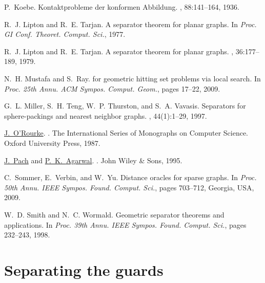 \InSubmitVer{\documentclass[11pt]{article}}
\numberwithin{figure}{section}
\numberwithin{table}{section}
\numberwithin{equation}{section}
\newcommand{\apndlab}[1]{\label{apnd:#1}}
\begin{document}
\begin{thebibliography}{{Har}11b}
P.~Koebe.
\newblock Kontaktprobleme der konformen {Abbildung}.
, 88:141--164, 1936.

R.~J. Lipton and R.~E. Tarjan.
\newblock A separator theorem for planar graphs.
\newblock In {\em Proc. GI Conf. Theoret. Comput. Sci.}, 1977.

R.~J. Lipton and R.~E. Tarjan.
\newblock A separator theorem for planar graphs.
, 36:177--189, 1979.

N.~H. Mustafa and S.~Ray.
 for geometric hitting set problems via local search.
\newblock In {\em Proc. 25th Annu. ACM Sympos. Comput. Geom.\CNFSoCG}, pages
  17--22, 2009.

G.~L. Miller, S.~H. Teng, W.~P. Thurston, and S.~A. Vavasis.
\newblock Separators for sphere-packings and nearest neighbor graphs.
, 44(1):1--29, 1997.

\href{http://cs.smith.edu/~orourke/}{J.~{O'Rourke}}.
.
\newblock The International Series of Monographs on Computer Science. Oxford
  University Press, 1987.

\href{http://www.math.nyu.edu/~pach}{J.~{Pach}} and \href{http://www.cs.duke.edu/~pankaj}{P.~K.~{Agarwal}}.
.
\newblock John Wiley \& Sons, 1995.

C.~Sommer, E.~Verbin, and W.~Yu.
\newblock Distance oracles for sparse graphs.
\newblock In {\em Proc. 50th Annu. IEEE Sympos. Found. Comput. Sci.\CNFFOCS},
  pages 703--712, Georgia, USA, 2009.

W.~D. Smith and N.~C. Wormald.
\newblock Geometric separator theorems and applications.
\newblock In {\em Proc. 39th Annu. IEEE Sympos. Found. Comput. Sci.\CNFFOCS},
  pages 232--243, 1998.

\end{thebibliography}



\appendix

\section{Separating the guards}
\apndlab{sperating:guards}
\end{document}
